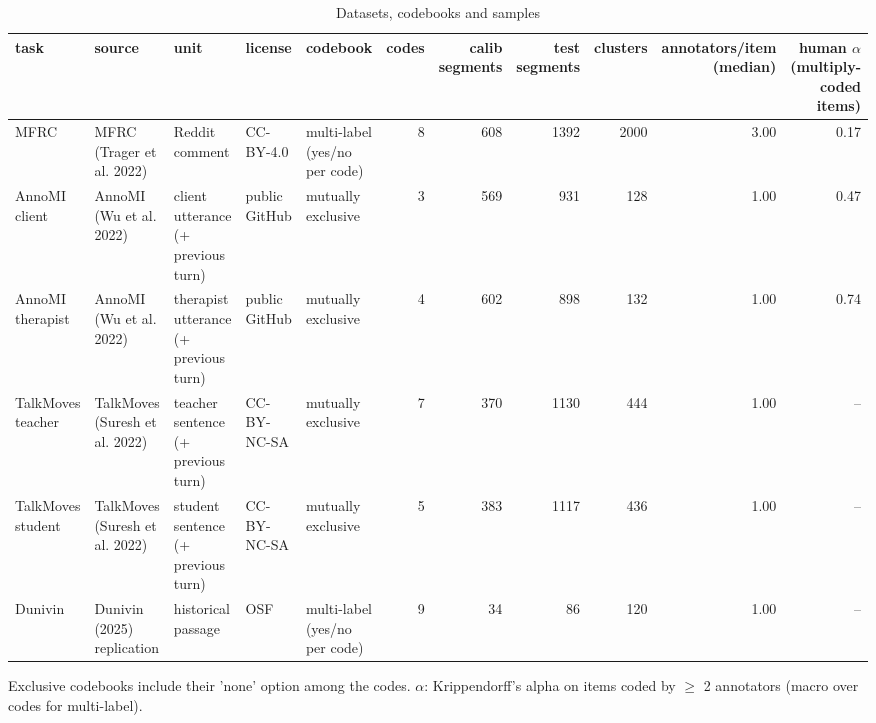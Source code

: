\begin{table}[t]
\centering
\small
\caption{Datasets, codebooks and samples}
\label{tab:tab01_datasets}
\begin{adjustbox}{max width=\linewidth}
\begin{tabular}{lllllrrrrrr}
\toprule
task & source & unit & license & codebook & codes & \makecell[br]{calib \\{} segments} & test segments & clusters & \makecell[br]{annotators/item \\{} (median)} & \makecell[br]{human $\alpha$ \\{} (multiply-coded \\{} items)} \\
\midrule
MFRC & MFRC (Trager et al. 2022) & Reddit comment & CC-BY-4.0 & multi-label (yes/no per code) & 8 & 608 & 1392 & 2000 & 3.00 & 0.17 \\
AnnoMI client & AnnoMI (Wu et al. 2022) & client utterance (+ previous turn) & public GitHub & mutually exclusive & 3 & 569 & 931 & 128 & 1.00 & 0.47 \\
AnnoMI therapist & AnnoMI (Wu et al. 2022) & therapist utterance (+ previous turn) & public GitHub & mutually exclusive & 4 & 602 & 898 & 132 & 1.00 & 0.74 \\
TalkMoves teacher & TalkMoves (Suresh et al. 2022) & teacher sentence (+ previous turn) & CC-BY-NC-SA & mutually exclusive & 7 & 370 & 1130 & 444 & 1.00 & -- \\
TalkMoves student & TalkMoves (Suresh et al. 2022) & student sentence (+ previous turn) & CC-BY-NC-SA & mutually exclusive & 5 & 383 & 1117 & 436 & 1.00 & -- \\
Dunivin & Dunivin (2025) replication & historical passage & OSF & multi-label (yes/no per code) & 9 & 34 & 86 & 120 & 1.00 & -- \\
\bottomrule
\end{tabular}
\end{adjustbox}
\par\smallskip\footnotesize\raggedright Exclusive codebooks include their 'none' option among the codes. $\alpha$: Krippendorff's alpha on items coded by $\geq$ 2 annotators (macro over codes for multi-label).
\end{table}
